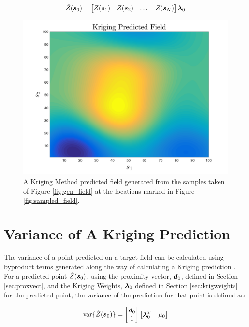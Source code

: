 \begin{equation}
    \hat{Z}({\it{\boldsymbol{s}}}_0) = \begin{bmatrix} Z({\it{\boldsymbol{s}}}_1) & Z({\it{\boldsymbol{s}}}_2) & \dots & Z({\it{\boldsymbol{s}}}_N) \end{bmatrix}{\it{\boldsymbol{\lambda}}}_{0}
    \label{eq:krigeq}
\end{equation}

\begin{figure}[!]
    \centering
    \includegraphics[width=0.8\linewidth]{figures/kriging_prediction.png}
    \ssp
    \caption{A Kriging Method predicted field generated from the samples taken of Figure \ref{fig:gen_field} at the locations marked in Figure \ref{fig:sampled_field}.}
    \label{fig:krig_field}
\end{figure}

\section{Variance of A Kriging Prediction} \label{sec:krigvar}
The variance of a point predicted on a target field can be calculated using byproduct terms generated along the way of calculating a Kriging prediction \cite{felus:srn}. For a predicted point $\hat{Z}({\it{\boldsymbol{s}}}_0)$, using the proximity vector, ${\it{\boldsymbol{d}}}_0$, defined in Section \ref{sec:proxvect}, and the Kriging Weights, ${\it{\boldsymbol{\lambda}}}_0$ defined in Section \ref{sec:krigweights} for the predicted point, the variance of the prediction for that point is defined as:

\begin{equation}
    \text{var}\{\hat{Z}({\it{\boldsymbol{s}}}_0)\} = \begin{bmatrix}{\it{\boldsymbol{d}}}_0 \\ 1\end{bmatrix} \begin{bmatrix}{\it{\boldsymbol{\lambda}}}_0^T & \mu_0 \end{bmatrix}
\end{equation}

